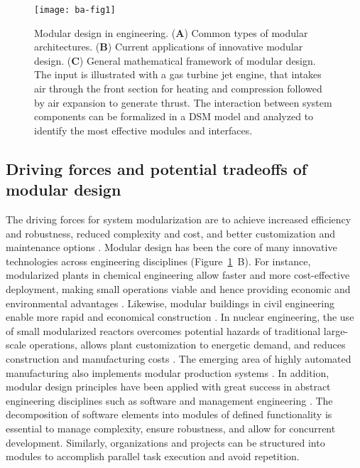 \begin{figure}[!p]
  \centering
  \texttt{[image: ba-fig1]}
    \caption[Modular design in engineering]{Modular design in engineering. (\textbf{A}) Common
types of modular architectures. (\textbf{B}) Current applications of
innovative modular design. (\textbf{C}) General mathematical framework
of modular design. The input is illustrated with a gas turbine jet
engine, that intakes air through the front section for heating and
compression followed by air expansion to generate thrust. The
interaction between system components can be formalized in a DSM model
    and analyzed to identify the most effective modules and interfaces.}
    \label{fig:ba-fig1}
\end{figure}


\subsection{Driving forces and potential tradeoffs of modular design}

The driving forces for system modularization are to achieve increased efficiency and robustness, reduced complexity and cost, and better customization and maintenance options \citep{bonvoisin2016, miller1998}.
Modular design has been the core of many innovative technologies across engineering disciplines (Figure~\ref{fig:ba-fig1}~B).
For instance, modularized plants in chemical engineering allow faster and more cost-effective deployment, making small operations viable and hence providing economic and environmental advantages \citep{baldea2017, kim2017}.
Likewise, modular buildings in civil engineering enable more rapid and economical construction \citep{kamali2016}.
In nuclear engineering, the use of small modularized reactors overcomes potential hazards of traditional large-scale operations, allows plant customization to energetic demand, and reduces construction and manufacturing costs \citep{RN137}.
The emerging area of highly automated manufacturing also implements modular production systems \citep{weyer2015}.
In addition, modular design principles have been applied with great success in abstract engineering disciplines such as software \citep{abelson1996, gancarz2003} and management engineering \citep{campagnolo2010}.
The decomposition of software elements into modules of defined functionality is essential to manage complexity, ensure robustness, and allow for concurrent development.
Similarly, organizations and projects can be structured into modules to accomplish parallel task execution and avoid repetition.

